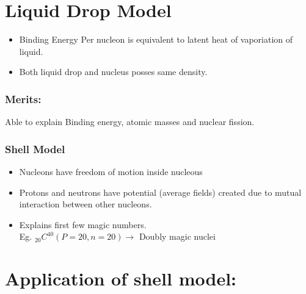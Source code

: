 \section{Liquid Drop Model}
\begin{itemize}
	\item Binding Energy Per nucleon is equivalent to latent heat of vaporiation of liquid.
	\item  Both liquid drop and nucleus posses same density. 
\end{itemize}
\subsubsection{Merits:}
Able to explain Binding energy, atomic masses and nuclear fission.
\subsubsection{Shell Model}
\begin{itemize}
	\item  Nucleons have freedom of motion inside nucleous \\
	\item Protons and neutrons have potential (average fields) created due to mutual interaction between other nucleons.
	\item Explains first few magic numbers.\\
	Eg. ${ }_{20} C^{40}(P=20, n=20) \rightarrow$ Doubly magic nuclei\\
	\end{itemize}
\section{Application of shell model:}
